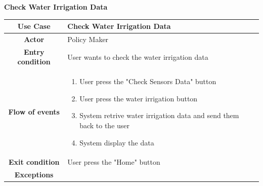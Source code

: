 \documentclass[table, 12pt]{article}
\begin{document}
\begin{itemize}
            \begin{table}[H]
                \item[] \textbf{Check Water Irrigation Data}
                \item[] 
                \centering
                \begin{tabular}{|c| m{}|}
                    \hline
                    \textbf{Use Case} & Check Water Irrigation Data\\ \hline
                    \textbf{Actor} & Policy Maker \\ \hline
                    \textbf{Entry condition} & User wants to check the water irrigation data\\  \hline
                    \textbf{Flow of events} & \begin{enumerate}
                                                \item User press the "Check Sensors Data" button
                                                \item User press the water irrigation button
                                                \item System retrive water irrigation data and send them back to the user 
                                                \item System display the data
                                            \end{enumerate}\\ \hline
                    \textbf{Exit condition} & User press the "Home" button\\ \hline
                    \textbf{Exceptions} &  \\ \hline                   
                \end{tabular}
            \end{table}


\end{itemize}
\end{document}
